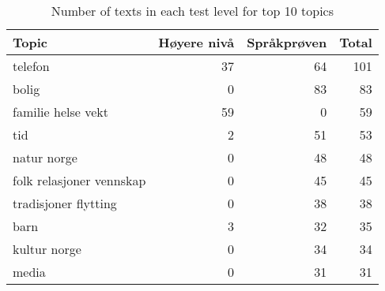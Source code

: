 \begin{table}
  \centering
  \begin{tabular}{lrrr}
    \toprule
    Topic                    & Høyere nivå & Språkprøven & Total \\
    \midrule
    telefon                  &          37 &          64 &   101 \\
    bolig                    &           0 &          83 &    83 \\
    familie helse vekt       &          59 &           0 &    59 \\
    tid                      &           2 &          51 &    53 \\
    natur norge              &           0 &          48 &    48 \\
    folk relasjoner vennskap &           0 &          45 &    45 \\
    tradisjoner flytting     &           0 &          38 &    38 \\
    barn                     &           3 &          32 &    35 \\
    kultur norge             &           0 &          34 &    34 \\
    media                    &           0 &          31 &    31 \\
    \bottomrule
  \end{tabular}
  \caption{Number of texts in each test level for top 10 topics}
  \label{texts-per-topic}
\end{table}
